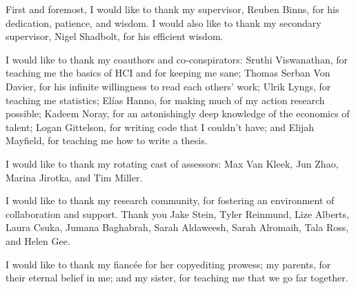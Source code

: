 First and foremost, I would like to thank my supervisor, Reuben Binns, for his dedication, patience, and wisdom. I would also like to thank my secondary supervisor, Nigel Shadbolt, for his efficient wisdom.

I would like to thank my coauthors and co-conspirators: Sruthi Viswanathan, for teaching me the basics of HCI and for keeping me sane; Thomas Serban Von Davier, for his infinite willingness to read each others' work; Ulrik Lyngs, for teaching me statistics; Elías Hanno, for making much of my action research possible; Kadeem Noray, for an astonishingly deep knowledge of the economics of talent; Logan Gittelson, for writing code that I couldn't have; and Elijah Mayfield, for teaching me how to write a thesis.

I would like to thank my rotating cast of assessors: Max Van Kleek, Jun Zhao, Marina Jirotka, and Tim Miller.

I would like to thank my research community, for fostering an environment of collaboration and support. Thank you Jake Stein, Tyler Reinmund, Lize Alberts, Laura Csuka, Jumana Baghabrah, Sarah Aldaweesh, Sarah Alromaih, Tala Ross, and Helen Gee.

I would like to thank my fiancée for her copyediting prowess; my parents, for their eternal belief in me; and my sister, for teaching me that we go far together.